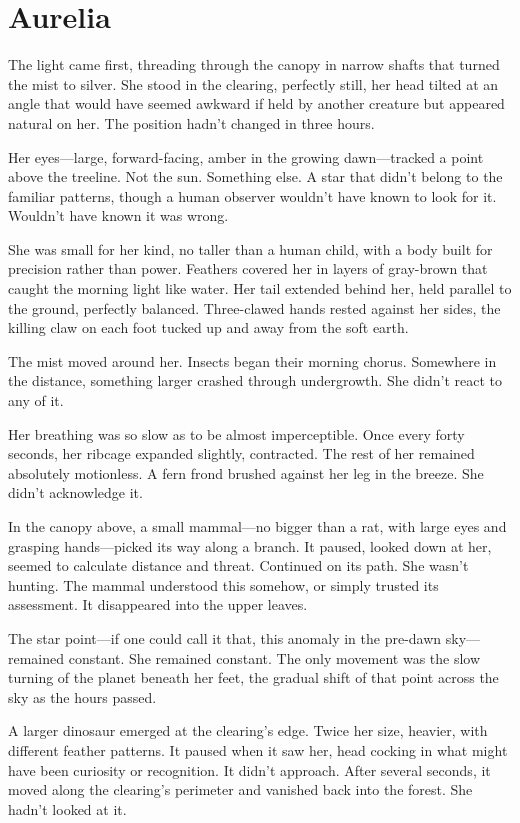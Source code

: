 \chapter{Aurelia}
\label{ch:01}


The light came first, threading through the canopy in narrow shafts that turned the mist to silver. She stood in the clearing, perfectly still, her head tilted at an angle that would have seemed awkward if held by another creature but appeared natural on her. The position hadn't changed in three hours.

Her eyes—large, forward-facing, amber in the growing dawn—tracked a point above the treeline. Not the sun. Something else. A star that didn't belong to the familiar patterns, though a human observer wouldn't have known to look for it. Wouldn't have known it was wrong.

She was small for her kind, no taller than a human child, with a body built for precision rather than power. Feathers covered her in layers of gray-brown that caught the morning light like water. Her tail extended behind her, held parallel to the ground, perfectly balanced. Three-clawed hands rested against her sides, the killing claw on each foot tucked up and away from the soft earth.

The mist moved around her. Insects began their morning chorus. Somewhere in the distance, something larger crashed through undergrowth. She didn't react to any of it.

Her breathing was so slow as to be almost imperceptible. Once every forty seconds, her ribcage expanded slightly, contracted. The rest of her remained absolutely motionless. A fern frond brushed against her leg in the breeze. She didn't acknowledge it.

In the canopy above, a small mammal—no bigger than a rat, with large eyes and grasping hands—picked its way along a branch. It paused, looked down at her, seemed to calculate distance and threat. Continued on its path. She wasn't hunting. The mammal understood this somehow, or simply trusted its assessment. It disappeared into the upper leaves.

The star point—if one could call it that, this anomaly in the pre-dawn sky—remained constant. She remained constant. The only movement was the slow turning of the planet beneath her feet, the gradual shift of that point across the sky as the hours passed.

A larger dinosaur emerged at the clearing's edge. Twice her size, heavier, with different feather patterns. It paused when it saw her, head cocking in what might have been curiosity or recognition. It didn't approach. After several seconds, it moved along the clearing's perimeter and vanished back into the forest. She hadn't looked at it.

